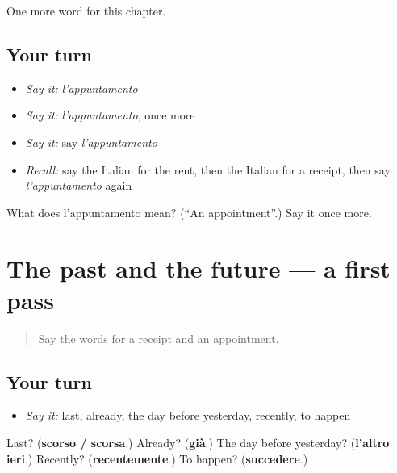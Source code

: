 \begin{grammarlens}[title={What you've built}]
One more word for this chapter.
\end{grammarlens}

\subsection*{Your turn}
\begin{itemize}
\raggedright
  \item \emph{Say it:} \emph{l'appuntamento}
  \item \emph{Say it:} \emph{l'appuntamento}, once more
  \item \emph{Say it:} say \emph{l'appuntamento}
  \item \emph{Recall:} say the Italian for the rent, then the Italian for a receipt, then say \emph{l'appuntamento} again
\end{itemize}

\begin{tcolorbox}[breakable,colback=teal!4,colframe=teal!35!black,title={Before you move on}]
What does l'appuntamento mean? (\textquotedblleft{}An appointment\textquotedblright{}.) Say it once more.
\end{tcolorbox}
\section[(dialogue)]{The past and the future — a first pass}

\label{lesson:IT-R139-first-pass-the-past-and-the-future}



\begin{quote}
Say the words for a receipt and an appointment.
\end{quote}

\subsection*{Your turn}
\begin{itemize}
\raggedright
  \item \emph{Say it:} last, already, the day before yesterday, recently, to happen
\end{itemize}

\begin{tcolorbox}[breakable,colback=teal!4,colframe=teal!35!black,title={Before you move on}]
Last? (\textbf{scorso / scorsa}.) Already? (\textbf{già}.) The day before yesterday? (\textbf{l'altro ieri}.) Recently? (\textbf{recentemente}.) To happen? (\textbf{succedere}.)
\end{tcolorbox}

